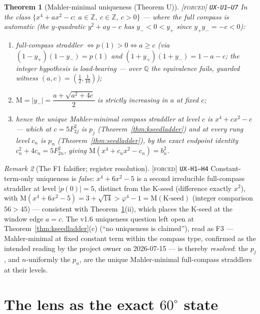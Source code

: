 \documentclass[11pt]{article}
\newcommand{\tagF}{\textcolor{cF}{\textsc{[forced]}}}
\newcommand{\hx}[1]{\textcolor{cC}{\footnotesize\texttt{#1}}}
\newcommand{\Q}{\mathbb{Q}}
\newcommand{\Z}{\mathbb{Z}}
\newcommand{\gp}{\varphi}
\newcommand{\M}{\mathrm{M}}
\theoremstyle{plain}
\newtheorem{theorem}{Theorem}[section]
\theoremstyle{definition}
\theoremstyle{remark}
\newtheorem{remark}[theorem]{Remark}
\begin{document}
\begin{theorem}[Mahler-minimal uniqueness (Theorem U)]\label{thm:mahlermin}\tagF{} \hx{UX-U1--U7}
In the class $\{x^4+ax^2-c:\ a\in\Z,\ c\in\Z,\ c>0\}$ --- where the full
compass is automatic (the $y$-quadratic $y^2+ay-c$ has $y_-<0<y_+$ since
$y_+y_-=-c<0$):
\begin{enumerate}[nosep,label=(\roman*)]
\item full-compass straddler $\iff p(1)>0\iff a\ge c$ (via
$(1-y_+)(1-y_-)=p(1)$ and $(1+y_+)(1+y_-)=1-a-c$; the \emph{integer}
hypothesis is load-bearing --- over $\Q$ the equivalence fails, guarded
witness $(a,c)=(\tfrac12,\tfrac1{10})$);
\item $\M=|y_-|=\dfrac{a+\sqrt{a^2+4c}}2$ is strictly increasing in $a$ at
fixed $c$;
\item hence the \emph{unique} Mahler-minimal compass straddler at level $c$
is $x^4+cx^2-c$ --- which at $c=5F_{2j}^2$ is $p_j$
(Theorem~\ref{thm:kseedladder}) and at every rung level $c_n$ is $p_n$
(Theorem~\ref{thm:seedladder}), by the exact endpoint identity
$c_n^2+4c_n=5F_{2n}^2$, giving $\M(x^4+c_nx^2-c_n)=b_n^2$.
\end{enumerate}
\end{theorem}

\begin{remark}[The F1 falsifier; register resolution]\label{rem:f1falsifier}\tagF{} \hx{UX-H1--H4}
Constant-term-only uniqueness is \emph{false}: $x^4+6x^2-5$ is a second
irreducible full-compass straddler at level $|p(0)|=5$, distinct from the
K-seed (difference exactly $x^2$), with
$\M(x^4+6x^2-5)=3+\sqrt{14}>\gp^4-1=\M(\text{K-seed})$ (integer comparison
$56>45$) --- consistent with Theorem~\ref{thm:mahlermin}(ii), which places
the K-seed at the window edge $a=c$. The v1.6 uniqueness question left open
at Theorem~\ref{thm:kseedladder}(c) (``no uniqueness is claimed''), read as
F3 --- Mahler-minimal at fixed constant term within the compass type,
confirmed as the intended reading by the project owner on 2026-07-15 --- is
thereby \emph{resolved}: the $p_j$, and $n$-uniformly the $p_n$, are the
unique Mahler-minimal full-compass straddlers at their levels.
\end{remark}

\section{The lens as the exact $60^\circ$ state}\label{sec:lens}
\end{document}

